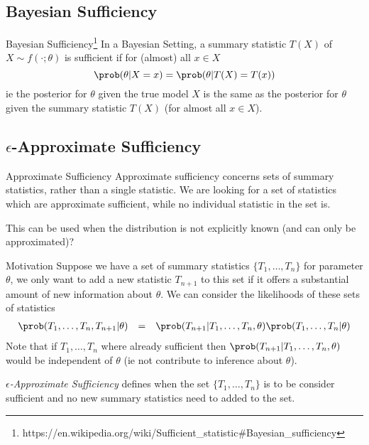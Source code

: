 \documentclass[11pt,a4paper]{article}
\begin{document}
\subsection*{Bayesian Sufficiency}

  \begin{definition}{Bayesian Sufficiency\footnote{https://en.wikipedia.org/wiki/Sufficient_statistic\#Bayesian_sufficiency}}
    In a Bayesian Setting, a summary statistic $T(X)$ of $X\sim f(\cdot;\theta)$ is sufficient if for (almost) all $x\in X$
    \[ \prob(\theta|X=x)=\prob(\theta|T(X)=T(x)) \]
    ie the posterior for $\theta$ given the true model $X$ is the same as the posterior for $\theta$ given the summary statistic $T(X)$ (for almost all $x\in X$).
  \end{definition}

\subsection*{$\epsilon$-Approximate Sufficiency}

  \begin{remark}{Approximate Sufficiency}
    Approximate sufficiency concerns sets of summary statistics, rather than a single statistic. We are looking for a set of statistics which are approximate sufficient, while no individual statistic in the set is.
    \par This can be used when the distribution is not explicitly known (and can only be approximated)?
  \end{remark}

  \begin{remark}{Motivation}
    Suppose we have a set of summary statistics $\{T_1,\dots,T_n\}$ for parameter $\theta$, we only want to add a new statistic $T_{n+1}$ to this set if it offers a substantial amount of new information about $\theta$. We can consider the likelihoods of these sets of statistics
    \[\begin{array}{rcl}
      \prob(T_1,\dots,T_n,T_{n+1}|\theta)&=&\prob(T_{n+1}|T_1,\dots,T_n,\theta)\prob(T_1,\dots,T_n|\theta)
    \end{array}\]
    Note that if $T_1,\dots,T_n$ where already sufficient then $\prob(T_{n+1}|T_1,\dots,T_n,\theta)$ would be independent of $\theta$ (ie not contribute to inference about $\theta$).
    \par \textit{$\epsilon$-Approximate Sufficiency} defines when the set $\{T_1,\dots,T_n\}$ is to be consider sufficient and no new summary statistics need to added to the set.
  \end{remark}
\end{document}

